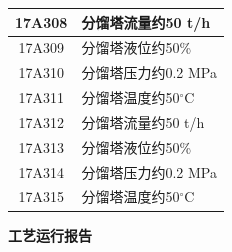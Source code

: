 \documentclass[UTF8,10pt,a4paper,fontset=fandol]{ctexart}
\begin{document}
\begin{center}
\begin{minipage}[t]{0.47\textwidth}
\begin{tabularx}{\linewidth}{|c|>{\RaggedRight\arraybackslash}X|}
17A308 & 分馏塔流量约50 t/h \\ \hline
17A309 & 分馏塔液位约50\% \\ \hline
17A310 & 分馏塔压力约0.2 MPa \\ \hline
17A311 & 分馏塔温度约50$^\circ$C \\ \hline
17A312 & 分馏塔流量约50 t/h \\ \hline
17A313 & 分馏塔液位约50\% \\ \hline
17A314 & 分馏塔压力约0.2 MPa \\ \hline
17A315 & 分馏塔温度约50$^\circ$C \\ \hline
\end{tabularx}
\end{minipage}

\vspace{1em}

\begin{minipage}[t]{0.47\textwidth}
\centering
\textbf{工艺运行报告}


\end{minipage}
\end{center}
\end{document}
